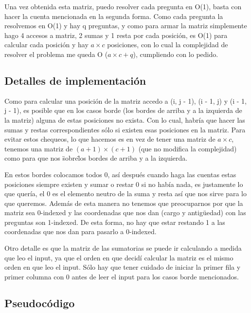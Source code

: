Una vez obtenida esta matriz, puedo resolver cada pregunta en O(1), basta con hacer la cuenta mencionada en la segunda forma. Como cada pregunta la resolvemos en O(1) y hay q preguntas, y como para armar la matriz simplemente hago 4 accesos a matriz, 2 sumas y 1 resta por cada posición, es O(1) para calcular cada posición y hay $a \times c$ posiciones, con lo cual la complejidad de resolver el problema me queda O ($a \times c + q$), cumpliendo con lo pedido.

\subsection {Detalles de implementación}

Como para calcular una posición de la matriz accedo a (i, j - 1),  (i - 1, j) y (i - 1, j - 1), es posible que en los casos borde (los bordes de arriba y a la izquierda de la matriz) alguna de estas posiciones no exista. Con lo cual, habría que hacer las sumas y restas correspondientes sólo si existen esas posiciones en la matriz. Para evitar estos chequeos, lo que hacemos es en vez de tener una matriz de $a \times c$, tenemos una matriz de $(a + 1) \times (c + 1)$ (que no modifica la complejidad) como para que nos \"sobre\" los bordes de arriba y a la izquierda. \newline

En estos bordes colocamos todos 0, así después cuando haga las cuentas estas posiciones siempre existen y sumar o restar 0 si no había nada, es justamente lo que quería, el 0 es el elemento neutro de la suma y resta así que nos sirve para lo que queremos. Además de esta manera no tenemos que preocuparnos por que la matriz sea 0-indexed y las coordenadas que nos dan (cargo y antigüedad) con las preguntas son 1-indexed. De esta forma, no hay que estar restando 1 a las coordenadas que nos dan para pasarlo a 0-indexed.\newline

Otro detalle es que la matriz de las sumatorias se puede ir calculando a medida que leo el input, ya que el orden en que decidí calcular la matriz es el mismo orden en que leo el input. Sólo hay que tener cuidado de iniciar la primer fila y primer columna con 0 antes de leer el input para los casos borde mencionados.


\subsection {Pseudocódigo}

